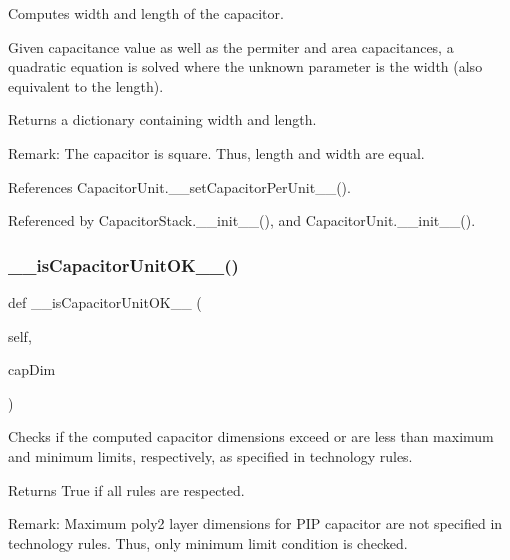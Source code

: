 Computes width and length of the capacitor. 

Given {\ttfamily capacitance} value as well as the permiter and area capacitances, a quadratic equation is solved where the unknown parameter is the width (also equivalent to the length). \begin{DoxyReturn}{Returns}
a dictionary containing width and length. 
\end{DoxyReturn}
\begin{DoxyParagraph}{Remark\+: The capacitor is square. Thus, length and width are equal. }

\end{DoxyParagraph}


References Capacitor\+Unit.\+\_\+\+\_\+set\+Capacitor\+Per\+Unit\+\_\+\+\_\+().



Referenced by Capacitor\+Stack.\+\_\+\+\_\+init\+\_\+\+\_\+(), and Capacitor\+Unit.\+\_\+\+\_\+init\+\_\+\+\_\+().

\mbox{\label{classpython_1_1capacitorunit_1_1CapacitorUnit_a2fcd6e2dddbbe5fcb09c9365cde11535}} 
\subsubsection{\texorpdfstring{\+\_\+\+\_\+is\+Capacitor\+Unit\+O\+K\+\_\+\+\_\+()}{\_\_isCapacitorUnitOK\_\_()}}
{\footnotesize\ttfamily def \+\_\+\+\_\+is\+Capacitor\+Unit\+O\+K\+\_\+\+\_\+ (\begin{DoxyParamCaption}\item[{}]{self,  }\item[{}]{cap\+Dim }\end{DoxyParamCaption})}



Checks if the computed capacitor dimensions exceed or are less than maximum and minimum limits, respectively, as specified in technology rules. 

\begin{DoxyReturn}{Returns}
{\ttfamily True} if all rules are respected. 
\end{DoxyReturn}
\begin{DoxyParagraph}{Remark\+: Maximum poly2 layer dimensions for P\+IP capacitor are not specified in technology rules. Thus, only minimum limit condition is checked. }

\end{DoxyParagraph}



